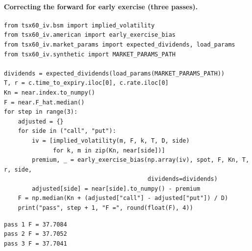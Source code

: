 \paragraph{Correcting the forward for early exercise (three passes).}
{\footnotesize
\begin{verbatim}
from tsx60_iv.bsm import implied_volatility
from tsx60_iv.american import early_exercise_bias
from tsx60_iv.market_params import expected_dividends, load_params
from tsx60_iv.synthetic import MARKET_PARAMS_PATH

dividends = expected_dividends(load_params(MARKET_PARAMS_PATH))
T, r = c.time_to_expiry.iloc[0], c.rate.iloc[0]
Kn = near.index.to_numpy()
F = near.F_hat.median()
for step in range(3):
    adjusted = {}
    for side in ("call", "put"):
        iv = [implied_volatility(m, F, k, T, D, side)
              for k, m in zip(Kn, near[side])]
        premium, _ = early_exercise_bias(np.array(iv), spot, F, Kn, T, r, side,
                                         dividends=dividends)
        adjusted[side] = near[side].to_numpy() - premium
    F = np.median(Kn + (adjusted["call"] - adjusted["put"]) / D)
    print("pass", step + 1, "F =", round(float(F), 4))
\end{verbatim}
\vspace{-0.6em}
\begin{verbatim}
pass 1 F = 37.7084
pass 2 F = 37.7052
pass 3 F = 37.7041
\end{verbatim}
}

